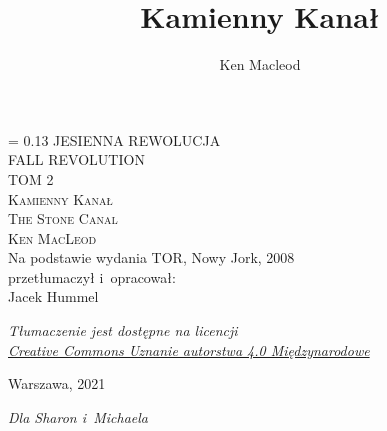\documentclass[oneside,polish,11pt,sfheadings]{mwbk}
\begin{document}
\title{Kamienny Kanał}
\author{Ken Macleod}


\DeclareRobustCommand{\cs}[1]{\texttt{\char`\\#1}}
\newlength{\tpheight}\setlength{\tpheight}{0.9\textheight}
\newlength{\txtheight}\setlength{\txtheight}{0.9\tpheight}
\newlength{\tpwidth}\setlength{\tpwidth}{0.9\textwidth}
\newlength{\txtwidth}\setlength{\txtwidth}{0.9\tpwidth}
\newlength{\drop}
\newcommand*{\titleSI}{\begingroup%
\drop = 0.13\txtheight
\centering
{\Huge \textsf{JESIENNA REWOLUCJA}}\\[1\baselineskip]
{\huge \textsf{FALL REVOLUTION}}\\[1\baselineskip]
{\LARGE  \textsf{TOM 2}}\\[4\baselineskip]
{\Huge \textsc{Kamienny Kanał}}\\[1\baselineskip]
{\LARGE \textsc{The Stone Canal}}\\[2\baselineskip]
{\huge \textsc{Ken MacLeod}}\\[4\baselineskip]
{\large Na podstawie wydania TOR, Nowy Jork, 2008 \\ przetłumaczył i~opracował:}\\
{\Large Jacek Hummel}\\[2\baselineskip]
{\normalsize \textit{Tłumaczenie jest dostępne na licencji\\
\href{https://creativecommons.org/licenses/by/4.0/deed.pl}{Creative Commons Uznanie autorstwa 4.0 Międzynarodowe}}\\[2\baselineskip]\par}
\vfill
{\Large {Warszawa, 2021}}\\
\endgroup}
\titleSI
\thispagestyle{empty}

\begin{figure}[p]
    \vspace*{-1cm}
\end{figure}
\thispagestyle{empty}


\newpage

\vspace*{2cm}


\emph{Dla Sharon i~Michaela}

\vspace*{5cm}

\end{document}

